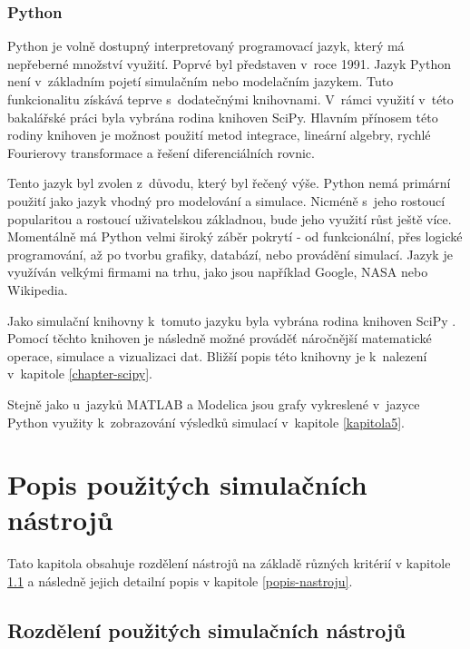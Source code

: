 \subsection{Python}
Python je volně dostupný interpretovaný programovací jazyk, který má nepřeberné množství využití. Poprvé byl představen v~roce 1991. Jazyk Python není v~základním pojetí simulačním nebo modelačním jazykem. Tuto funkcionalitu získává teprve s~dodatečnými knihovnami. V~rámci využití v~této bakalářské práci byla vybrána rodina knihoven SciPy. Hlavním přínosem této rodiny knihoven je možnost použití metod integrace, lineární algebry, rychlé Fourierovy transformace a řešení diferenciálních rovnic.

Tento jazyk byl zvolen z~důvodu, který byl řečený výše. Python nemá primární použití jako jazyk vhodný pro modelování a simulace. Nicméně s~jeho rostoucí popularitou a rostoucí uživatelskou základnou, bude jeho využití růst ještě více. Momentálně má Python velmi široký záběr pokrytí - od funkcionální, přes logické programování, až po tvorbu grafiky, databází, nebo provádění simulací. Jazyk je využíván velkými firmami na trhu, jako jsou například Google, NASA nebo Wikipedia.

Jako simulační knihovny k~tomuto jazyku byla vybrána rodina knihoven SciPy \cite{scipy}. Pomocí těchto knihoven je následně možné prováděť náročnější matematické operace, simulace a vizualizaci dat. Bližší popis této knihovny je k~nalezení v~kapitole \ref{chapter-scipy}.

Stejně jako u~jazyků MATLAB a Modelica jsou grafy vykreslené v~jazyce Python využity k~zobrazování výsledků simulací v~kapitole \ref{kapitola5}.

\chapter{Popis použitých simulačních nástrojů}
\label{kapitola3}
Tato kapitola obsahuje rozdělení nástrojů na základě různých kritérií v kapitole \ref{rozdeleni-nastroju} a následně jejich detailní popis v kapitole \ref{popis-nastroju}.

\section{Rozdělení použitých simulačních nástrojů}
\label{rozdeleni-nastroju}

